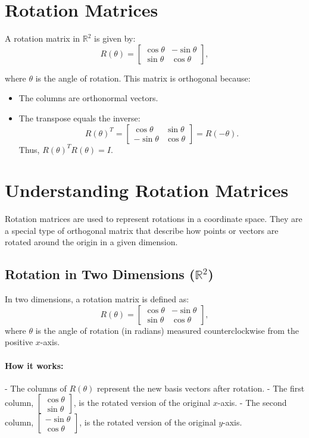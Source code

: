 \documentclass{article}
\begin{document}
\section*{Rotation Matrices}
A rotation matrix in $\mathbb{R}^2$ is given by:
\[R(\theta) = \begin{bmatrix}
\cos \theta & -\sin \theta \\
\sin \theta & \cos \theta
\end{bmatrix},\]

where $\theta$ is the angle of rotation. This matrix is orthogonal because:
\begin{itemize}
    \item The columns are orthonormal vectors.
    \item The transpose equals the inverse:
    \[R(\theta)^T = \begin{bmatrix}\cos \theta & \sin \theta \\
    -\sin \theta & \cos \theta
    \end{bmatrix} = R(-\theta).\]
    Thus, $R(\theta)^T R(\theta) = I$.
\end{itemize}
\section*{Understanding Rotation Matrices}
Rotation matrices are used to represent rotations in a coordinate space. They are a special type of orthogonal matrix that describe how points or vectors are rotated around the origin in a given dimension.

\subsection*{Rotation in Two Dimensions ($\mathbb{R}^2$)}
In two dimensions, a rotation matrix is defined as:
\[R(\theta) = \begin{bmatrix}
\cos \theta & -\sin \theta \\
\sin \theta & \cos \theta
\end{bmatrix},\]
where $\theta$ is the angle of rotation (in radians) measured counterclockwise from the positive $x$-axis.

\paragraph{How it works:}
- The columns of $R(\theta)$ represent the new basis vectors after rotation.
- The first column, $\begin{bmatrix} \cos \theta \\ \sin \theta \end{bmatrix}$, is the rotated version of the original $x$-axis.
- The second column, $\begin{bmatrix} -\sin \theta \\ \cos \theta \end{bmatrix}$, is the rotated version of the original $y$-axis.
\end{document}
